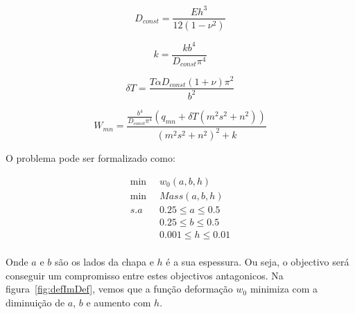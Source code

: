 \documentclass[a4paper,12pt]{article}
\begin{document}
\begin{equation}\label{eq:fo}
D_{const}=\frac{E h^3}{12\left(1-{\nu}^2\right)}
\end{equation}

\begin{equation}\label{eq:fo}
k=\frac{k b^4}{D_{const} {\pi}^4}
\end{equation}

\begin{equation}\label{eq:fo}
\delta T=\frac{T \alpha D_{const} \left(1+\nu\right) {\pi}^2}{b^2}
\end{equation}

\begin{equation}\label{eq:fo}
W_{mn}=\frac{\frac{b^4}{D_{const} {\pi}^4} \left(q_{mn}+\delta T \left(m^2 s^2+n^2\right)\right)}{{\left(m^2 s^2+n^2\right)}^2+k}
\end{equation}


O problema pode ser formalizado como:

\begin{equation}\label{eq:prob}
\begin{split}
\min\;\; &w_{0}(a, b, h)\\
\min\;\; &Mass(a, b, h)\\
s.a\;\; & 0.25\leq a\leq 0.5\\
& 0.25\leq b\leq 0.5\\
& 0.001\leq h\leq 0.01\\
\end{split}
\end{equation}

Onde $a$ e $b$ são os lados da chapa e $h$ é a sua espessura. Ou seja, o objectivo será conseguir um compromisso entre estes objectivos antagonicos.
Na figura~\ref{fig:defImDef}, vemos que a função deformação $w_{0}$ minimiza com a diminuição de $a$, $b$ e aumento com $h$.
\end{document}

